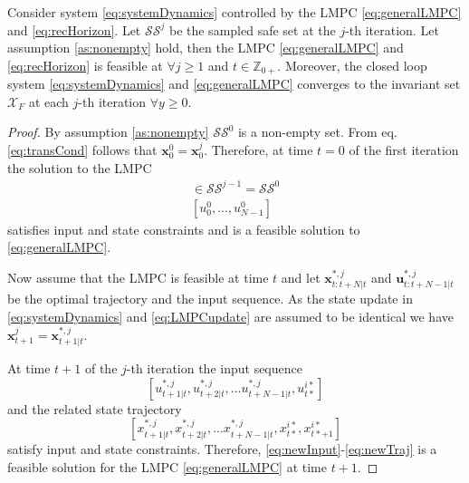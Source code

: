 \begin{theorem}
Consider system \eqref{eq:systemDynamics} controlled by the LMPC \eqref{eq:generalLMPC} and \eqref{eq:recHorizon}. Let $\mathcal{SS}^j$ be the sampled safe set at the $j$-th iteration. Let assumption \ref{as:nonempty} hold, then the LMPC \eqref{eq:generalLMPC} and \eqref{eq:recHorizon} is feasible at $\forall j\geq 1$ and $t\in \mathbb{Z}_{0+}$. Moreover, the closed loop system \eqref{eq:systemDynamics} and \eqref{eq:generalLMPC} converges to the invariant set $\mathcal{X}_F$ at each $j$-th iteration $\forall y\geq 0$.
\end{theorem}
\begin{proof}
By assumption \ref{as:nonempty} $\mathcal{SS}^0$ is a non-empty set. From eq. \eqref{eq:transCond} follows that $\bm{x}_0^0=\bm{x}_0^j$. Therefore, at time $t=0$ of the first iteration the solution to the LMPC
\begin{align}
[x_0^0,...,x_N^0]\in\mathcal{SS}^{j-1}=\mathcal{SS}^0\\
[u_0^0,...,u_{N-1}^0]
\end{align}
satisfies input and state constraints and is a feasible solution to \eqref{eq:generalLMPC}.

Now assume that the LMPC is feasible at time $t$ and let $\bm{x}_{t:t+N|t}^{*,j}$ and $\bm{u}_{t:t+N-1|t}^{*,j}$ be the optimal trajectory and the input sequence. As the state update in \eqref{eq:systemDynamics} and \eqref{eq:LMPCupdate} are assumed to be identical we have $\bm{x}_{t+1}^j=\bm{x}_{t+1|t}^{*,j}$.

At time $t+1$ of the $j$-th iteration the input sequence
\begin{equation}\label{eq:newInput}
[u_{t+1|t}^{*,j},u_{t+2|t}^{*,j},...u_{t+N-1|t}^{*,j},u_{t*}^{i*}]
\end{equation}
and the related state trajectory
\begin{equation}\label{eq:newTraj}
[x_{t+1|t}^{*,j},x_{t+2|t}^{*,j},...x_{t+N-1|t}^{*,j},x_{t*}^{i*},x_{t*+1}^{i*}]
\end{equation}
satisfy input and state constraints. Therefore, \eqref{eq:newInput}-\eqref{eq:newTraj} is a feasible solution for the LMPC \eqref{eq:generalLMPC} at time $t+1$.


\end{proof}
